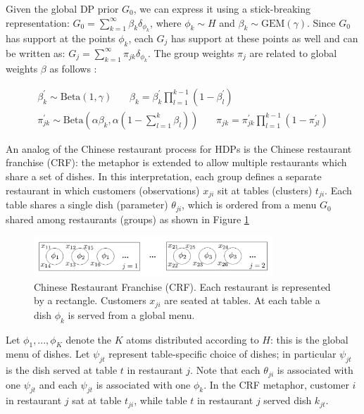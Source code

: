 Given the global DP prior $G_0$, we can express it using a stick-breaking representation:
$G_0 = \sum_{k=1}^{\infty}\beta_k \delta_{\phi_k}$, where $\phi_k \sim H$ and $\beta_k \sim \mathrm{GEM}(\gamma)$. Since $G_0$ has support at the points $\phi_k$, each $G_j$ has support at these points as well and can be written as: $G_j = \sum_{k=1}^{\infty}\pi_{jk}\delta_{\phi_k}$. The group weights $\pi_j$ are related to global weights $\beta$ as follows \cite{teh2005jasa}:

\begin{eqnarray}
    \beta_{k}^{\prime} \sim \mathrm{Beta}(1,\gamma) ~~~~~~~~ \beta_k = \beta_{k}^{\prime}\prod_{l=1}^{k-1}(1-\beta_{l}^{\prime})\\
    \pi_{jk}^{\prime} \sim \mathrm{Beta}(\alpha\beta_k, \alpha(1-\sum_{l=1}^{k}\beta_l)) ~~~~~~~~ \pi_{jk} = \pi_{jk}^{\prime}\prod_{l=1}^{k-1}(1-\pi_{jl}^{\prime})
\end{eqnarray}

An analog of the Chinese restaurant process for HDPs is the Chinese restaurant franchise (CRF): the metaphor is extended to allow multiple restaurants which share a set of dishes. In this interpretation, each group defines a separate restaurant in which customers (observations) $x_{ji}$ sit at tables (clusters) $t_{ji}$. Each table shares a single dish (parameter) $\theta_{ji}$, which is ordered from a menu $G_0$ shared among restaurants (groups) as shown in Figure \ref{fig:crf}\\
\begin{figure}[thpb]
    \centering
    \includegraphics[width=0.8\textwidth, trim={10 10 10 10}]{figures/crf.png}
    \caption{Chinese Restaurant Franchise (CRF). Each restaurant is represented by a rectangle. Customers $x_{ji}$ are seated at tables. At each table a dish $\phi_k$ is served from a global menu.}
    \label{fig:crf}
\end{figure}

Let $\phi_1,...,\phi_K$ denote the $K$ atoms distributed according to $H$: this is the global menu of dishes. Let $\psi_{jt}$ represent table-specific choice of dishes; in particular $\psi_{jt}$ is the dish served at table $t$ in restaurant $j$. Note that each $\theta_{ji}$ is associated with one $\psi_{jt}$ and each $\psi_{jt}$ is associated with one $\phi_k$. In the CRF metaphor, customer $i$ in restaurant $j$ sat at table $t_{ji}$, while table $t$ in restaurant $j$ served dish $k_{jt}$.


